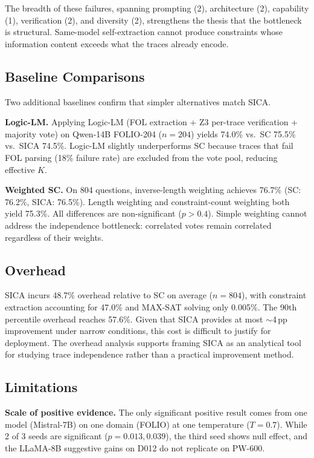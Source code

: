 \documentclass[11pt,a4paper]{article}
\begin{document}
The breadth of these failures, spanning prompting (2), architecture (2), capability (1), verification (2), and diversity (2), strengthens the thesis that the bottleneck is structural. Same-model self-extraction cannot produce constraints whose information content exceeds what the traces already encode.

\subsection{Baseline Comparisons}

Two additional baselines confirm that simpler alternatives match SICA.

\textbf{Logic-LM.} Applying Logic-LM (FOL extraction + Z3 per-trace verification + majority vote) on Qwen-14B FOLIO-204 ($n=204$) yields 74.0\% vs.\ SC 75.5\% vs.\ SICA 74.5\%. Logic-LM slightly underperforms SC because traces that fail FOL parsing (18\% failure rate) are excluded from the vote pool, reducing effective $K$.

\textbf{Weighted SC.} On 804 questions, inverse-length weighting achieves 76.7\% (SC: 76.2\%, SICA: 76.5\%). Length weighting and constraint-count weighting both yield 75.3\%. All differences are non-significant ($p > 0.4$). Simple weighting cannot address the independence bottleneck: correlated votes remain correlated regardless of their weights.

\subsection{Overhead}

SICA incurs 48.7\% overhead relative to SC on average ($n=804$), with constraint extraction accounting for 47.0\% and MAX-SAT solving only 0.005\%. The 90th percentile overhead reaches 57.6\%. Given that SICA provides at most $\sim$4\,pp improvement under narrow conditions, this cost is difficult to justify for deployment. The overhead analysis supports framing SICA as an analytical tool for studying trace independence rather than a practical improvement method.

\subsection{Limitations}

\textbf{Scale of positive evidence.} The only significant positive result comes from one model (Mistral-7B) on one domain (FOLIO) at one temperature ($T=0.7$). While 2 of 3 seeds are significant ($p = 0.013, 0.039$), the third seed shows null effect, and the LLaMA-8B suggestive gains on D012 do not replicate on PW-600.
\end{document}

